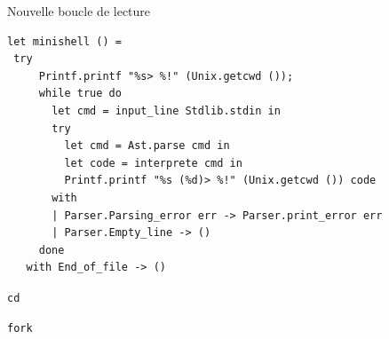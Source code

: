\begin{frame}[fragile]{Nouvelle boucle de lecture}
\begin{lstlisting}
let minishell () =
 try
     Printf.printf "%s> %!" (Unix.getcwd ());
     while true do
       let cmd = input_line Stdlib.stdin in
       try
         let cmd = Ast.parse cmd in
         let code = interprete cmd in
         Printf.printf "%s (%d)> %!" (Unix.getcwd ()) code
       with
       | Parser.Parsing_error err -> Parser.print_error err
       | Parser.Empty_line -> ()
     done
   with End_of_file -> ()
\end{lstlisting}
\end{frame}

\begin{frame}{}

\end{frame}

\begin{frame}{\texttt{cd}}

\end{frame}

\begin{frame}{\texttt{fork}}

\end{frame}

